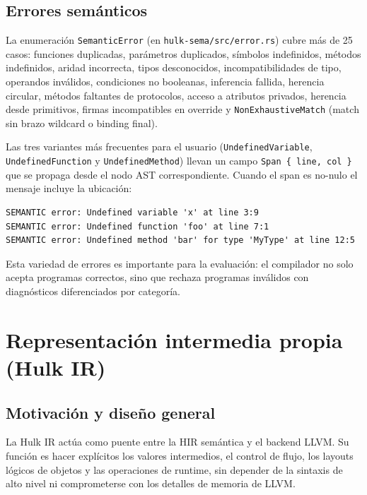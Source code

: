 \documentclass[12pt,letterpaper]{article}
\newcommand{\src}[1]{\texttt{#1}}
\begin{document}
\subsection{Errores semánticos}

La enumeración \src{SemanticError} (en \src{hulk-sema/src/error.rs}) cubre más de 25 casos: funciones duplicadas, parámetros duplicados, símbolos indefinidos, métodos indefinidos, aridad incorrecta, tipos desconocidos, incompatibilidades de tipo, operandos inválidos, condiciones no booleanas, inferencia fallida, herencia circular, métodos faltantes de protocolos, acceso a atributos privados, herencia desde primitivos, firmas incompatibles en override y \src{NonExhaustiveMatch} (match sin brazo wildcard o binding final).

Las tres variantes más frecuentes para el usuario (\src{UndefinedVariable}, \src{UndefinedFunction} y \src{UndefinedMethod}) llevan un campo \src{Span \{ line, col \}} que se propaga desde el nodo AST correspondiente. Cuando el span es no-nulo el mensaje incluye la ubicación:

\begin{lstlisting}[caption={Ejemplos de errores semánticos con ubicación}]
SEMANTIC error: Undefined variable 'x' at line 3:9
SEMANTIC error: Undefined function 'foo' at line 7:1
SEMANTIC error: Undefined method 'bar' for type 'MyType' at line 12:5
\end{lstlisting}

Esta variedad de errores es importante para la evaluación: el compilador no solo acepta programas correctos, sino que rechaza programas inválidos con diagnósticos diferenciados por categoría.

\section{Representación intermedia propia (Hulk IR)}

\subsection{Motivación y diseño general}

La Hulk IR actúa como puente entre la HIR semántica y el backend LLVM. Su función es hacer explícitos los valores intermedios, el control de flujo, los layouts lógicos de objetos y las operaciones de runtime, sin depender de la sintaxis de alto nivel ni comprometerse con los detalles de memoria de LLVM.
\end{document}
